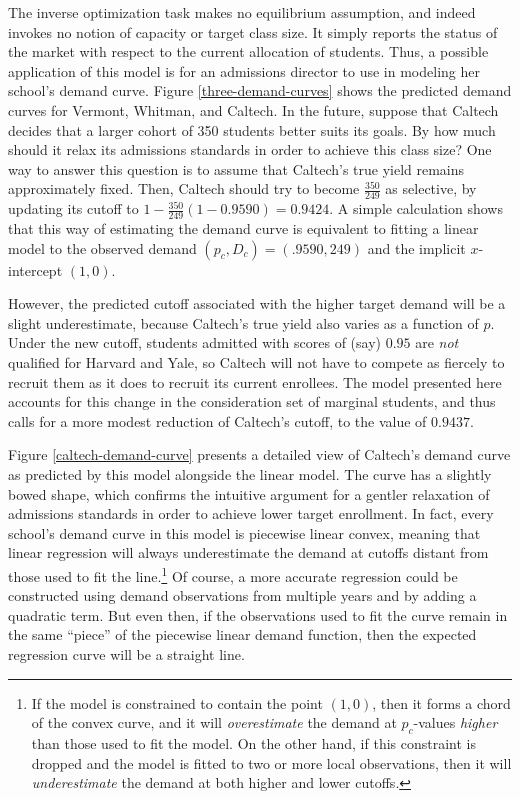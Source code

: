 \documentclass[12pt]{article}
\theoremstyle{definition}
\begin{document}
The inverse optimization task makes no equilibrium assumption, and indeed invokes no notion of capacity or target class size. It simply reports the status of the market with respect to the current allocation of students. Thus, a possible application of this model is for an admissions director to use in modeling her school's demand curve. Figure \ref{three-demand-curves} shows the predicted demand curves for Vermont, Whitman, and Caltech. In the future, suppose that Caltech decides that a larger cohort of 350 students better suits its goals. By how much should it relax its admissions standards in order to achieve this class size? One way to answer this question is to assume that Caltech’s true yield remains approximately fixed. Then, Caltech should try to become $\frac{350}{249}$ as selective, by updating its cutoff to $1 - \frac{350}{249}(1 - 0.9590) = 0.9424$. A simple calculation shows that this way of estimating the demand curve is equivalent to fitting a linear model to the observed demand $(p_c, D_c) = (.9590, 249)$ and the implicit $x$-intercept $(1, 0)$. 

However, the predicted cutoff associated with the higher target demand will be a slight underestimate, because Caltech’s true yield also varies as a function of $p$. Under the new cutoff, students admitted with scores of (say) $0.95$ are \emph{not} qualified for Harvard and Yale, so Caltech will not have to compete as fiercely to recruit them as it does to recruit its current enrollees. The model presented here accounts for this change in the consideration set of marginal students, and thus calls for a more modest reduction of Caltech’s cutoff, to the value of $0.9437$.

Figure \ref{caltech-demand-curve} presents a detailed view of Caltech’s demand curve as predicted by this model alongside the linear model. The curve has a slightly bowed shape, which confirms the intuitive argument for a gentler relaxation of admissions standards in order to achieve lower target enrollment. In fact, every school’s demand curve in this model is piecewise linear convex, meaning that linear regression will always underestimate the demand at cutoffs distant from those used to fit the line.\footnote{If the model is constrained to contain the point $(1, 0)$, then it forms a chord of the convex curve, and it will \emph{overestimate} the demand at $p_c$-values \emph{higher} than those used to fit the model. On the other hand, if this constraint is dropped and the model is fitted to two or more local observations, then it will \emph{underestimate} the demand at both higher and lower cutoffs.} Of course, a more accurate regression could be constructed using demand observations from multiple years and by adding a quadratic term. But even then, if the observations used to fit the curve remain in the same ``piece'' of the piecewise linear demand function, then the expected regression curve will be a straight line.
\end{document}
